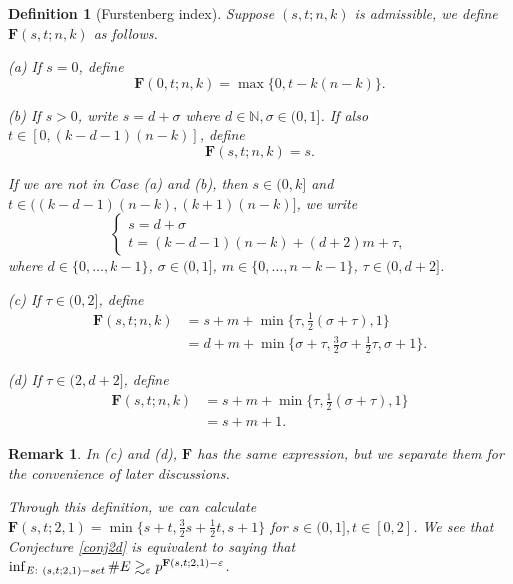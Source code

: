 \documentclass[10pt]{article}
\newtheorem{remark}[theorem]{Remark}
\newtheorem{definition}[theorem]{Definition}
\newcommand{\bF}{\mathbf{F}}
\newcommand{\N}{\mathbb N}
\newcommand{\e}{\varepsilon}
\newcommand{\si}{\sigma}
\begin{document}
\begin{definition}[Furstenberg index]\label{deffurindex}
    Suppose $(s,t;n,k)$ is admissible, we define $\bF(s,t;n,k)$ as follows.
    
    (a) If $s=0$, define
    \begin{equation}
        \bF(0,t;n,k)= \max\{0,t-k(n-k)\}.
    \end{equation}

    (b) If $s>0$, write $s=d+\si$ where $d\in\N, \si\in(0,1]$. If also $t\in [0,(k-d-1)(n-k)]$, define
    \begin{equation}
        \bF(s,t;n,k)= s.
    \end{equation}


    If we are not in Case (a) and (b), then $s\in (0,k]$ and $t\in ((k-d-1)(n-k),(k+1)(n-k)]$,
    we write 
\begin{equation}\label{expression}
    \begin{cases}
        s=d+\si\\
        t=(k-d-1)(n-k)+(d+2)m+\tau,
    \end{cases}
\end{equation} 
    where $d\in\{0,\dots,k-1\}$, $\si\in (0,1]$,  $m\in\{0,\dots,n-k-1\}$, $\tau\in (0,d+2]$. 

(c) If $\tau\in(0,2]$, define
\begin{equation}
\begin{split}
    \bF(s,t;n,k)&=s+m+\min\{\tau,\frac12(\si+\tau),1\}\\
    &= d+m+\min\{\si+\tau,\frac32\si+\frac12\tau,\si+1\}.
\end{split}
\end{equation}

(d) If $\tau\in (2,d+2]$, define
\begin{equation}
\begin{split}
    \bF(s,t;n,k)&=s+m+\min\{\tau,\frac12(\si+\tau),1\}\\
    &= s+m+1.
\end{split}
\end{equation}
    
    
\end{definition}

\begin{remark}
    {\rm In (c) and (d), $\bF$ has the same expression, but we separate them for the convenience of later discussions.
    
    Through this definition, we can calculate $\bF(s,t;2,1)=\min\{s+t,\frac32s+\frac12t,s+1\}$ for $s\in (0,1], t\in [0,2]$. We see that Conjecture \ref{conj2d} is equivalent to saying that $\inf_{E:\ (s,t;2,1)\textup{-set}} \#E\gtrsim_\e p^{\bF(s,t;2,1)-\e}$. }
\end{remark}
\end{document}

